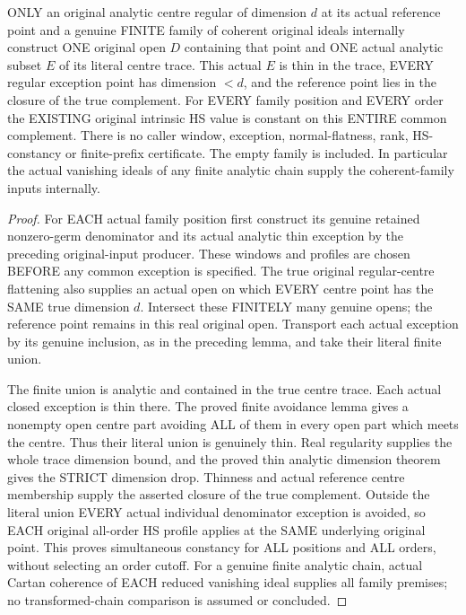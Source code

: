 \begin{theorem}
\label{hir:original-finite-family-simultaneous-all-intrinsic-hs-exception}
\leanok
ONLY an original analytic centre regular of dimension $d$ at its actual
reference point and a genuine FINITE family of coherent original ideals
internally construct ONE original open $D$ containing that point and ONE
actual analytic subset $E$ of its literal centre trace. This actual $E$
is thin in the trace, EVERY regular exception point has dimension $<d$,
and the reference point lies in the closure of the true complement.
For EVERY family position and EVERY order the EXISTING original intrinsic
HS value is constant on this ENTIRE common complement. There is no caller
window, exception, normal-flatness, rank, HS-constancy or finite-prefix
certificate. The empty family is included. In particular the actual
vanishing ideals of any finite analytic chain supply the coherent-family
inputs internally.
\end{theorem}
\begin{proof}
For EACH actual family position first construct its genuine retained
nonzero-germ denominator and its actual analytic thin exception by the
preceding original-input producer. These windows and profiles are chosen
BEFORE any common exception is specified. The true original regular-centre
flattening also supplies an actual open on which EVERY centre point has
the SAME true dimension $d$. Intersect these FINITELY many genuine opens;
the reference point remains in this real original open. Transport each
actual exception by its genuine inclusion, as in the preceding lemma,
and take their literal finite union.

The finite union is analytic and contained in the true centre trace.
Each actual closed exception is thin there. The proved finite avoidance
lemma gives a nonempty open centre part avoiding ALL of them in every
open part which meets the centre. Thus their literal union is genuinely
thin. Real regularity supplies the whole trace dimension bound, and the
proved thin analytic dimension theorem gives the STRICT dimension drop.
Thinness and actual reference centre membership supply the asserted
closure of the true complement. Outside the literal union EVERY actual
individual denominator exception is avoided, so EACH original all-order
HS profile applies at the SAME underlying original point. This proves
simultaneous constancy for ALL positions and ALL orders, without selecting
an order cutoff. For a genuine finite analytic chain, actual Cartan
coherence of EACH reduced vanishing ideal supplies all family premises;
no transformed-chain comparison is assumed or concluded.
\end{proof}
